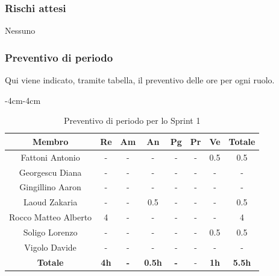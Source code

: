 \documentclass[a4paper,12pt]{article}
\begin{document}
\subsubsection{Rischi attesi}
Nessuno

\subsubsection{Preventivo di periodo}
Qui viene indicato, tramite tabella, il preventivo delle ore per ogni ruolo.
\begin{table}[H]
    \begin{adjustwidth}{-4cm}{-4cm}
    \centering
    \begin{tabular}{|c|c|c|c|c|c|c|c|}
        \hline
        \textbf{Membro}& \textbf{Re} & \textbf{Am} & \textbf{An} & \textbf{Pg} & \textbf{Pr} & \textbf{Ve} & \textbf{Totale} \\
        \hline
        Fattoni Antonio & - & - & - & - & - & 0.5& 0.5\\
        \hline
        Georgescu Diana& - & - & - & - & - & - & - \\
        \hline
        Gingillino Aaron& - & - & - & - & - & - & - \\
        \hline
        Laoud Zakaria& - & - & 0.5& - & - & - & 0.5\\
        \hline
        Rocco Matteo Alberto& 4& -& -& -& -& -&4\\
        \hline
        Soligo Lorenzo& -& -& -& -& -& 0.5&0.5\\
        \hline
        Vigolo Davide& -& -& -& -& -& -&-\\
        \hline
        \textbf{Totale} & \textbf{4h}& \textbf{-} & \textbf{0.5h}& \textbf{-}& -& \textbf{1h}& \textbf{5.5h}\\
        \hline
    \end{tabular}
    \caption{Preventivo di periodo per lo Sprint 1}
    \end{adjustwidth}
\end{table}
\end{document}

